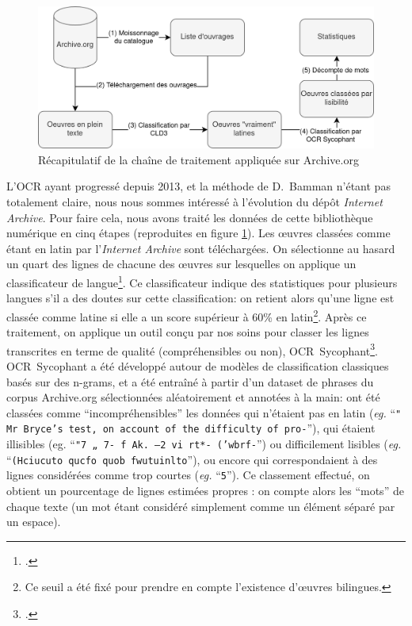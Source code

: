 \begin{figure}
    \centering
    \includegraphics[width=.8\linewidth]{figures/chap1/part1/ocrSycophant.png}
    \caption{Récapitulatif de la chaîne de traitement appliquée sur Archive.org}
    \label{fig:chap1:workflow-sycophant}
\end{figure}

L'OCR ayant progressé depuis 2013, et la méthode de D.~Bamman n'étant pas totalement claire, nous nous sommes intéressé à l'évolution du dépôt \textit{Internet Archive}. Pour faire cela, nous avons traité les données de cette bibliothèque numérique en cinq étapes (reproduites en figure \ref{fig:chap1:workflow-sycophant}). Les œuvres classées comme étant en latin par l'\textit{Internet Archive} sont téléchargées. On sélectionne au hasard un quart des lignes de chacune des œuvres sur lesquelles on applique un classificateur de langue\footcite{salcianu2018compact}. 
Ce classificateur indique des statistiques pour plusieurs langues s'il a des doutes sur cette classification: on retient alors qu'une ligne est classée comme latine si elle a un score supérieur à 60\% en latin\footnote{Ce seuil a été fixé pour prendre en compte l'existence d'œuvres bilingues.}. Après ce traitement, on applique un outil conçu par nos soins pour classer les lignes transcrites en terme de qualité (compréhensibles ou non), OCR~Sycophant\footcite{Clerice_OCR_Sycophant_2021}. OCR~Sycophant a été développé autour de modèles de classification classiques basés sur des n-grams, et a été entraîné à partir d'un dataset de phrases du corpus Archive.org sélectionnées aléatoirement et annotées à la main: ont été classées comme ``incompréhensibles'' les données qui n'étaient pas en latin (\textit{eg.} ``\texttt{" Mr Bryce's test, on account of the difficulty of pro-}''), qui étaient illisibles (eg. ``\texttt{"7 „ 7- f Ak. —2 vi rt*- ('wbrf-}'') ou difficilement lisibles (\textit{eg.} ``\texttt{(Hciucuto qucfo quob fwutuinlto}''), ou encore qui correspondaient à des lignes considérées comme trop courtes (\textit{eg.} ``\texttt{5}''). Ce classement effectué, on obtient un pourcentage de lignes estimées propres : on compte alors les \enquote{mots} de chaque texte (un mot étant considéré simplement comme un élément séparé par un espace).

